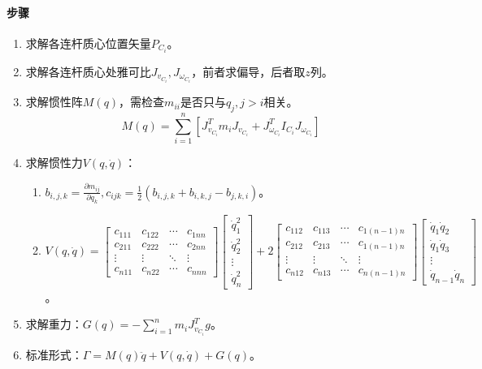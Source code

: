 \documentclass[
12pt, %
a4paper, 
oneside, %
headinclude,footinclude, %
]{scrartcl}
\begin{document}
\paragraph{步骤}
\begin{enumerate}
\item 求解各连杆质心位置矢量$ P_{C_i} $。
\item 求解各连杆质心处雅可比$ J_{v_{C_i}}, J_{\omega_{C_i}} $，前者求偏导，后者取$ z $列。
\item 求解惯性阵$ M(q) $，需检查$ m_{ii} $是否只与$ q_j, j > i $相关。
$$ M(q) = \sum_{i = 1}^{n}[J_{v_{C_i}}^T m_i J_{v_{C_i}} + J_{\omega_{C_i}}^T I_{C_i} J_{\omega_{C_i}}] $$
\item 求解惯性力$ V(q, \dot{q}) $：
\begin{enumerate}
\item $ b_{i,j,k} = \frac{\partial m_{ij}}{\partial q_k}, c_{ijk} = \frac{1}{2}(b_{i,j,k} + b_{i,k,j} - b_{j,k,i}) $。
\item 
$
V(q, \dot{q}) = 
\begin{bmatrix} c_{111} & c_{122} & \cdots & c_{1nn} \\ c_{211} & c_{222} & \cdots & c_{2nn} \\ \vdots & \vdots & \ddots & \vdots \\ c_{n11} & c_{n22} & \cdots & c_{nnn} \end{bmatrix} \begin{bmatrix} \dot{q}_1^2 \\ \dot{q}_2^2 \\ \vdots \\ \dot{q}_n^2 \end{bmatrix}
+ 2\begin{bmatrix} c_{112} & c_{113} & \cdots & c_{1(n - 1)n} \\ c_{212} & c_{213} & \cdots & c_{1(n - 1)n} \\ \vdots & \vdots & \ddots & \vdots \\ c_{n12} & c_{n13} & \cdots & c_{n(n - 1)n} \end{bmatrix} \begin{bmatrix} \dot{q}_1 \dot{q}_2 \\ \dot{q}_1 \dot{q}_3 \\ \vdots \\ \dot{q}_{n - 1} \dot{q}_n \end{bmatrix}
$。
\end{enumerate}
\item 求解重力：$ G(q) = -\sum_{i = 1}^{n} m_i J_{v_{C_i}}^T g $。
\item 标准形式：$ \Gamma = M(q) \ddot{q} + V(q, \dot{q}) + G(q) $。
\end{enumerate}
\end{document}
